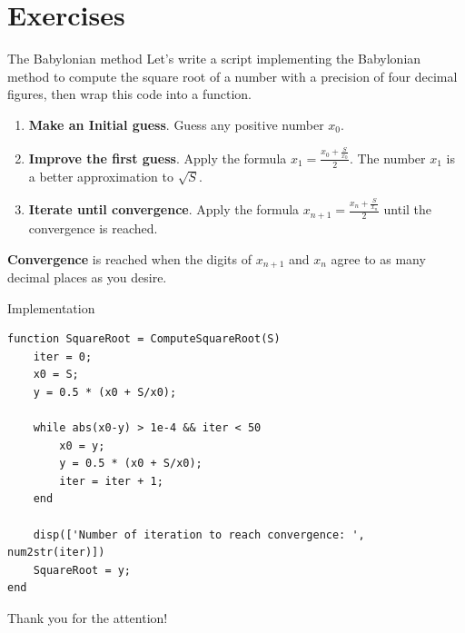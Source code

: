 \documentclass[aspectratio=169]{beamer}
\begin{document}
\section{Exercises}
% 

\begin{frame}{The Babylonian method}
    \textcolor{NavyBlue}{Let's write a script implementing the Babylonian method to compute the square root of a number with a precision of four decimal figures, then wrap this code into a function.}
    \begin{enumerate}
        \item \textbf{Make an Initial guess}.
              Guess any positive number $x_{0}$.
        \item \textbf{Improve the first guess}.
              Apply the formula $x_{1} = \frac{x_{0} + \frac{S}{x_{0}}}{2}$. The number $x_{1}$
              is a better approximation to $\sqrt{S}$.
        \item \textbf{Iterate until convergence}.
              Apply the formula $x_{n+1} = \frac{x_{n} + \frac{S}{x_{n}}}{2}$ until the
              convergence is reached.
    \end{enumerate}
    \textbf{Convergence} is reached when the digits of $x_{n+1}$ and $x_{n}$ agree to as many
    decimal places as you desire.
\end{frame}

\begin{frame}[fragile]{Implementation}
    \begin{verbatim}
function SquareRoot = ComputeSquareRoot(S)
    iter = 0;
    x0 = S;
    y = 0.5 * (x0 + S/x0);
    
    while abs(x0-y) > 1e-4 && iter < 50
        x0 = y;
        y = 0.5 * (x0 + S/x0);
        iter = iter + 1;
    end
    
    disp(['Number of iteration to reach convergence: ', num2str(iter)])
    SquareRoot = y;
end
    \end{verbatim}
\end{frame}

{
    \begin{frame}[standout]
        Thank you for the attention!
    \end{frame}
}
\end{document}
